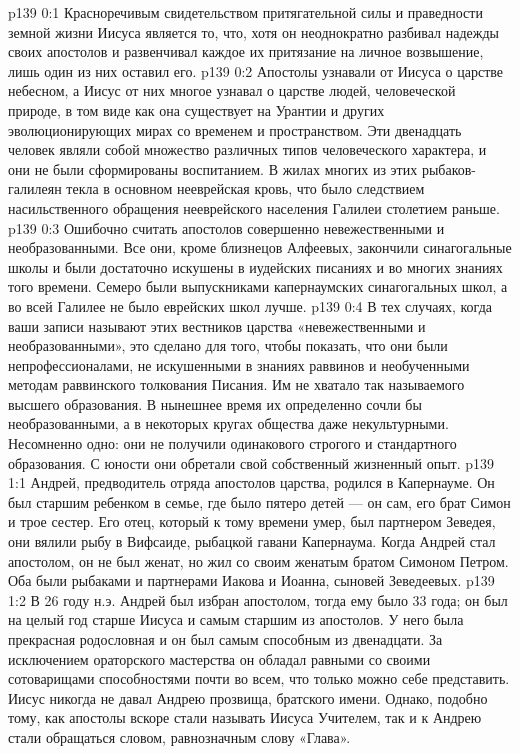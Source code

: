 \author{Комиссия срединников}
\vs p139 0:1 Красноречивым свидетельством притягательной силы и праведности земной жизни Иисуса является то, что, хотя он неоднократно разбивал надежды своих апостолов и развенчивал каждое их притязание на личное возвышение, лишь один из них оставил его.
\vs p139 0:2 Апостолы узнавали от Иисуса о царстве небесном, а Иисус от них многое узнавал о царстве людей, человеческой природе, в том виде как она существует на Урантии и других эволюционирующих мирах со временем и пространством. Эти двенадцать человек являли собой множество различных типов человеческого характера, и они не были сформированы  воспитанием. В жилах многих из этих рыбаков\hyp{}галилеян текла в основном нееврейская кровь, что было следствием насильственного обращения нееврейского населения Галилеи столетием раньше.
\vs p139 0:3 \pc Ошибочно считать апостолов совершенно невежественными и необразованными. Все они, кроме близнецов Алфеевых, закончили синагогальные школы и были достаточно искушены в иудейских писаниях и во многих знаниях того времени. Семеро были выпускниками капернаумских синагогальных школ, а во всей Галилее не было еврейских школ лучше.
\vs p139 0:4 В тех случаях, когда ваши записи называют этих вестников царства «невежественными и необразованными», это сделано для того, чтобы показать, что они были непрофессионалами, не искушенными в знаниях раввинов и необученными методам раввинского толкования Писания. Им не хватало так называемого высшего образования. В нынешнее время их определенно сочли бы необразованными, а в некоторых кругах общества даже некультурными. Несомненно одно: они не получили одинакового строгого и стандартного образования. С юности они обретали свой собственный жизненный опыт.
\vs p139 1:1 Андрей, предводитель отряда апостолов царства, родился в Капернауме. Он был старшим ребенком в семье, где было пятеро детей --- он сам, его брат Симон и трое сестер. Его отец, который к тому времени умер, был партнером Зеведея, они вялили рыбу в Вифсаиде, рыбацкой гавани Капернаума. Когда Андрей стал апостолом, он не был женат, но жил со своим женатым братом Симоном Петром. Оба были рыбаками и партнерами Иакова и Иоанна, сыновей Зеведеевых.
\vs p139 1:2 В 26 году н.э. Андрей был избран апостолом, тогда ему было 33 года; он был на целый год старше Иисуса и самым старшим из апостолов. У него была прекрасная родословная и он был самым способным из двенадцати. За исключением ораторского мастерства он обладал равными со своими сотоварищами способностями почти во всем, что только можно себе представить. Иисус никогда не давал Андрею прозвища, братского имени. Однако, подобно тому, как апостолы вскоре стали называть Иисуса Учителем, так и к Андрею стали обращаться словом, равнозначным слову «Глава».
